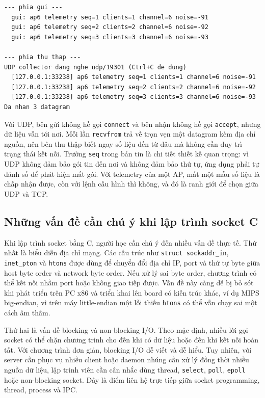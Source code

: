 \documentclass[11pt]{article}
\newcommand{\code}[1]{\texttt{#1}}
\begin{document}
\begin{lstlisting}[caption={UDP telemetry: gửi datagram định kỳ, không cần kết nối}]
--- phia gui ---
  gui: ap6 telemetry seq=1 clients=1 channel=6 noise=-91
  gui: ap6 telemetry seq=2 clients=2 channel=6 noise=-92
  gui: ap6 telemetry seq=3 clients=3 channel=6 noise=-93

--- phia thu thap ---
UDP collector dang nghe udp/19301 (Ctrl+C de dung)
  [127.0.0.1:33238] ap6 telemetry seq=1 clients=1 channel=6 noise=-91
  [127.0.0.1:33238] ap6 telemetry seq=2 clients=2 channel=6 noise=-92
  [127.0.0.1:33238] ap6 telemetry seq=3 clients=3 channel=6 noise=-93
Da nhan 3 datagram
\end{lstlisting}

Với UDP, bên gửi không hề gọi \code{connect} và bên nhận không hề gọi \code{accept}, nhưng dữ liệu vẫn tới nơi. Mỗi lần \code{recvfrom} trả về trọn vẹn một datagram kèm địa chỉ nguồn, nên bên thu thập biết ngay số liệu đến từ đâu mà không cần duy trì trạng thái kết nối. Trường \code{seq} trong bản tin là chi tiết thiết kế quan trọng: vì UDP không đảm bảo gói tin đến nơi và không đảm bảo thứ tự, ứng dụng phải tự đánh số để phát hiện mất gói. Với telemetry của một AP, mất một mẫu số liệu là chấp nhận được, còn với lệnh cấu hình thì không, và đó là ranh giới để chọn giữa UDP và TCP.

\subsection{Những vấn đề cần chú ý khi lập trình socket C}

Khi lập trình socket bằng C, người học cần chú ý đến nhiều vấn đề thực tế. Thứ nhất là biểu diễn địa chỉ mạng. Các cấu trúc như \code{struct sockaddr\_in}, \code{inet\_pton} và \code{htons} được dùng để chuyển đổi địa chỉ IP, port và thứ tự byte giữa host byte order và network byte order. Nếu xử lý sai byte order, chương trình có thể kết nối nhầm port hoặc không giao tiếp được. Vấn đề này càng dễ bị bỏ sót khi phát triển trên PC x86 và triển khai lên board có kiến trúc khác, ví dụ MIPS big-endian, vì trên máy little-endian một lỗi thiếu \code{htons} có thể vẫn chạy sai một cách âm thầm.

Thứ hai là vấn đề blocking và non-blocking I/O. Theo mặc định, nhiều lời gọi socket có thể chặn chương trình cho đến khi có dữ liệu hoặc đến khi kết nối hoàn tất. Với chương trình đơn giản, blocking I/O dễ viết và dễ hiểu. Tuy nhiên, với server cần phục vụ nhiều client hoặc daemon nhúng cần xử lý đồng thời nhiều nguồn dữ liệu, lập trình viên cần cân nhắc dùng thread, \code{select}, \code{poll}, \code{epoll} hoặc non-blocking socket. Đây là điểm liên hệ trực tiếp giữa socket programming, thread, process và IPC.
\end{document}
